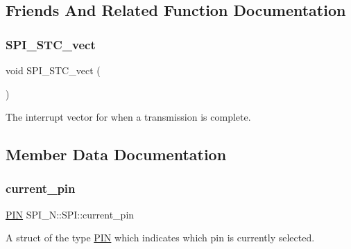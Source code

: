 \subsection{Friends And Related Function Documentation}
\hypertarget{class_s_p_i___n_1_1_s_p_i_a96543550133e0b0c6ae83faad5c0d68d}{}\label{class_s_p_i___n_1_1_s_p_i_a96543550133e0b0c6ae83faad5c0d68d} 
\subsubsection{\texorpdfstring{S\+P\+I\+\_\+\+S\+T\+C\+\_\+vect}{SPI\_STC\_vect}}
{\footnotesize\ttfamily void S\+P\+I\+\_\+\+S\+T\+C\+\_\+vect (\begin{DoxyParamCaption}{ }\end{DoxyParamCaption})\hspace{0.3cm}{\ttfamily [friend]}}

The interrupt vector for when a transmission is complete. 

\subsection{Member Data Documentation}
\hypertarget{class_s_p_i___n_1_1_s_p_i_ac016c4eaed2db3f8b5523bf0d472ddd2}{}\label{class_s_p_i___n_1_1_s_p_i_ac016c4eaed2db3f8b5523bf0d472ddd2} 
\subsubsection{\texorpdfstring{current\+\_\+pin}{current\_pin}}
{\footnotesize\ttfamily \hyperlink{struct_s_p_i___n_1_1_p_i_n}{P\+IN} S\+P\+I\+\_\+\+N\+::\+S\+P\+I\+::current\+\_\+pin\hspace{0.3cm}{\ttfamily [private]}}

A struct of the type \hyperlink{struct_s_p_i___n_1_1_p_i_n}{P\+IN} which indicates which pin is currently selected. \hypertarget{class_s_p_i___n_1_1_s_p_i_a89115bf64f31cd26d0b6ed3292decabb}{}\label{class_s_p_i___n_1_1_s_p_i_a89115bf64f31cd26d0b6ed3292decabb} 
